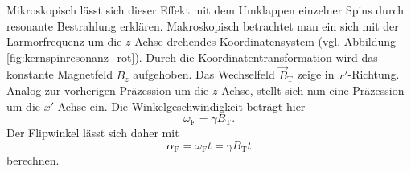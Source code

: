 \documentclass[
    11pt,
    ngerman
]{scrreprt}
\begin{document}
Mikroskopisch lässt sich dieser Effekt mit dem Umklappen einzelner Spins durch
resonante Bestrahlung erklären. Makroskopisch betrachtet man ein sich mit der
Larmorfrequenz um die $z$-Achse drehendes Koordinatensystem (vgl. Abbildung
\ref{fig:kernspinresonanz_rot}). Durch die Koordinatentransformation wird das
konstante Magnetfeld $B_z$ aufgehoben. Das Wechselfeld $\vec B_\text{T}$ zeige
in $x'$-Richtung. Analog zur vorherigen Präzession um die $z$-Achse, stellt
sich nun eine Präzession um die $x'$-Achse ein. Die Winkelgeschwindigkeit
beträgt hier
\[
    \omega_\text{F} = \gamma B_\text{T}.
\]
Der Flipwinkel lässt sich daher mit
\[
    \alpha_\text{F} = \omega_\text{F} t = \gamma B_\text{T} t
\]
berechnen.

\begin{figure}[htbp]
    \begin{minipage}[htbp]{.45\textwidth}
        \centering
\end{minipage}
\end{figure}
\end{document}
